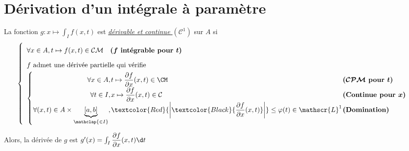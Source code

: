 \documentclass[11pt,a4paper,fleqn,pdftex]{report}
\begin{document}
\section{Dérivation d'un intégrale à paramètre} %
\label{sec:derivation_d_un_integrale_parametre}
\begin{itheorem}[Dérivabilité]
\label{thm:derivation_d_une_integrale_parametres}
La fonction $g : x \mapsto \int_I f(x,t)$ est \uline{\emph{dérivable et continue $\left( \mathcal{C}^1 \right)$}} sur $A$ si 
\begin{equation}
\left\lbrace
\begin{array}{l}
\forall x\in A, t \mapsto f(x,t) \in \mathcal{CM}\quad \boldsymbol{(f} \text{\textbf{ intégrable pour }}\boldsymbol{t)}\\
f \text{ admet une dérivée partielle qui vérifie} \\
\left\lbrace
\arraycolsep=0.5pt\def\arraystretch{1.8}
\begin{array}{r l l}
\forall x \in A,& t\mapsto \dfrac{\partial f}{\partial x}(x,t) \in \CM &\boldsymbol{( \mathcal{CPM} }\text{\textbf{ pour }}\boldsymbol{t)}\\
\forall t\in I,& x\mapsto \dfrac{\partial f}{\partial x}(x,t) \in \mathcal{C} &\text{\textbf{(Continue pour }}\boldsymbol{x)}\\
\forall (x,t) \in A \times \underbrace{[a,b]}_{\mathclap{\in I}},& \textcolor{Red}{\left|\textcolor{Black}{\dfrac{\partial f}{\partial x}(x,t)}\right|} \le \varphi(t) \in \mathscr{L}^1 & \text{\textbf{(Domination)}}
\end{array}
\right.
\end{array}
\right.
\end{equation}

Alors, la dérivée de $g$ est $g'(x) = \int_I \dfrac{\partial f}{\partial x}(x,t) \d t$
\end{itheorem}
\end{document}
